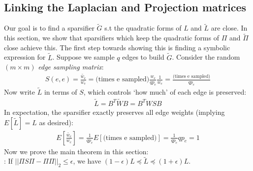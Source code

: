\documentclass{article}
\begin{document}
\subsection{Linking the Laplacian and Projection matrices}

Our goal is to find a sparsifier $\tilde{G}$ s.t the quadratic forms of $L$
and $\tilde{L}$ are close. In this section, we show that sparsifiers which
keep the quadratic forms of $\Pi$ and $\tilde{\Pi}$ close achieve this. The
first step towards showing this is finding a symbolic expression for
$\tilde{L}$. Suppose we sample $q$ edges to build $\tilde{G}$. Consider the
random $(m \times m)$ \textit{edge sampling matrix}:
\begin{align*}
    S(e, e) = \frac{\tilde{w_e}}{w_e} = \text{(times e
    sampled)}\frac{w_e}{qp_e}\frac{1}{w_e} = \frac{\text{(times e
    sampled)}}{qp_e}
\end{align*}
Now write $\tilde{L}$ in terms of $S$, which controls `how much' of each
edge is preserved:
\begin{align*}
    \tilde{L} = B^T\tilde{W}B = B^TWSB
\end{align*}
In expectation, the sparsifier exactly preserves all edge weights (implying
$E[\tilde{L}] = L$ as desired):
\begin{align*}
    E\left[\frac{\tilde{w_e}}{w_e}\right] = \frac{1}{qp_e}E[\text{(times e
    sampled)}] = \frac{1}{qp_e}qp_e = 1
\end{align*}
Now we prove the main theorem in this section: \\

\noindent
{}: If $||\Pi S\Pi - \Pi\Pi||_2 \leq
\epsilon$, we have $(1-\epsilon)L \preceq \tilde{L} \preceq (1+\epsilon)L$.
\end{document}
